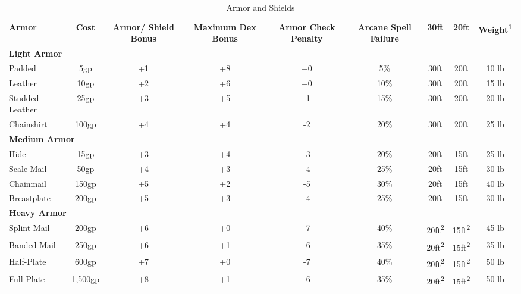 \begin{table}[htb]
\mcinherit
\caption{Armor and Shields}
\centering
\begin{tabular}{l c c c c c c c c}
\textbf{Armor} & \textbf{Cost} & \multicolumn{1}{p{1cm}}{\textbf{Armor/ Shield Bonus}} & \multicolumn{1}{p{1.5cm}}{\textbf{Maximum Dex Bonus}} & \multicolumn{1}{p{1cm}}{\textbf{Armor Check Penalty}} & \multicolumn{1}{p{1.1cm}}{\textbf{Arcane Spell Failure}} & \textbf{30ft} &\textbf{20ft} & \textbf{Weight\textsuperscript{1}}\\

\multicolumn{9}{l}{\textbf{Light Armor}}\\
\hspace{.5cm}Padded & 5gp & +1 & +8 & +0 & 5\% & 30ft & 20ft & 10 lb\\
\hspace{.5cm}Leather & 10gp & +2 & +6 & +0 & 10\% & 30ft & 20ft & 15 lb\\
\hspace{.5cm}Studded Leather & 25gp & +3 & +5 & -1 & 15\% & 30ft & 20ft & 20 lb\\
\hspace{.5cm}Chainshirt & 100gp & +4 & +4 & -2 & 20\% & 30ft & 20ft & 25 lb\\

\multicolumn{9}{l}{\textbf{Medium Armor}}\\
\hspace{.5cm}Hide & 15gp & +3 & +4 & -3 & 20\% & 20ft & 15ft & 25 lb\\
\hspace{.5cm}Scale Mail & 50gp & +4 & +3 & -4 & 25\% & 20ft & 15ft & 30 lb\\
\hspace{.5cm}Chainmail & 150gp & +5 & +2 & -5 & 30\% & 20ft & 15ft & 40 lb\\
\hspace{.5cm}Breastplate & 200gp & +5 & +3 & -4 & 25\% & 20ft & 15ft & 30 lb\\

\multicolumn{9}{l}{\textbf{Heavy Armor}}\\
\hspace{.5cm}Splint Mail & 200gp & +6 & +0 & -7 & 40\% & 20ft\textsuperscript{2} & 15ft\textsuperscript{2} & 45 lb\\
\hspace{.5cm}Banded Mail & 250gp & +6 & +1 & -6 & 35\% & 20ft\textsuperscript{2} & 15ft\textsuperscript{2} & 35 lb\\
\hspace{.5cm}Half-Plate & 600gp & +7 & +0 & -7 & 40\% & 20ft\textsuperscript{2} & 15ft\textsuperscript{2} & 50 lb\\
\hspace{.5cm}Full Plate & 1,500gp & +8 & +1 & -6 & 35\% & 20ft\textsuperscript{2} & 15ft\textsuperscript{2} & 50 lb\\


\end{tabular}
\end{table}

